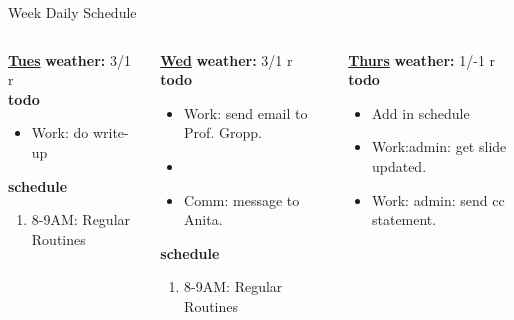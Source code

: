 \begin{columns}
\begin{column}{0.6\linewidth}
\begin{block}{Week Daily Schedule}
\begin{columns}
          \begin{column}{0.14\textwidth}{\small \underline{\bf Tues}}
            {\bf {\tiny  weather:} } {\tiny 3/1 r} \\ 
            {\bf {\tiny todo}}\\ 
            \begin{itemize}
              \tiny \item \tiny Work: do write-up 
            \end{itemize} 
                {{\bf {\tiny  schedule}}}
                \begin{enumerate} 
                  \tiny \item \tiny 8-9AM: Regular Routines 
                \end{enumerate} 
          \end{column}
          \begin{column}{0.14\textwidth}{\small \underline{\bf Wed}}
            {\tiny \bf weather: } {\tiny 3/1 r} \\ 
            {\tiny {\bf todo}}\\
            \begin{itemize}
              \tiny \item \tiny Work: send email to Prof. Gropp. 
            \item \tiny 
            \item \tiny Comm: message to Anita. 
            \end{itemize}
                {\tiny \bf schedule}\\
                \begin{enumerate} 
                  \tiny \item \tiny 8-9AM: Regular Routines 
                \end{enumerate} 
          \end{column}

          \begin{column}{0.14\textwidth}{\small \underline{\bf Thurs}}
            {\tiny \bf weather: } {\tiny 1/-1 r }\\ 
            {\tiny \bf todo} \\ 
            \begin{itemize}
              \tiny \item \tiny Add in schedule 
            \item \tiny Work:admin: get slide updated.  
              \item \tiny Work: admin: send cc statement. 


\end{itemize}
\end{column}
\end{columns}
\end{block}
\end{column}
\end{columns}
